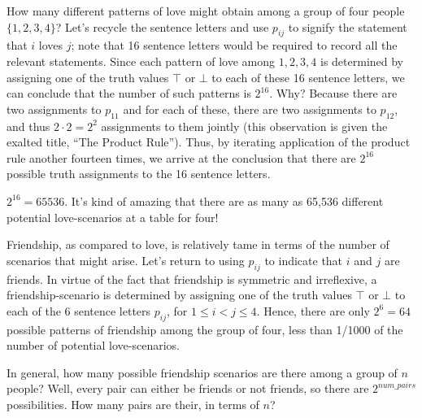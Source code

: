 How many different patterns of love might obtain among a group of four people $\{1,2,3,4\}$? Let's recycle the sentence letters and use $p_{ij}$ to signify the statement that $i$ loves $j$; note that 16 sentence letters would be required to record all the relevant statements. Since each pattern of love among $1,2,3,4$ is determined by assigning one of the truth values $\top$ or $\bot$ to each of these 16 sentence letters, we can conclude that the number of such patterns is $2^{16}$. Why? Because there are two assignments to $p_{11}$ and for each of these, there are two assignments to $p_{12}$, and thus $2\cdot 2 = 2^2$ assignments to them jointly (this observation is given the exalted title, ``The Product Rule''). Thus, by iterating application of the product rule another fourteen times, we arrive at the conclusion that there are $2^{16}$ possible truth assignments to the 16 sentence letters. 

\begin{aside}
    $2^{16} = 65536$. It's kind of amazing that there are as many as 65,536 different potential love-scenarios at a table for four!
\end{aside}

Friendship, as compared to love, is relatively tame in terms of the number of scenarios that might arise. Let's return to using $p_{ij}$ to indicate that $i$ and $j$ are friends. In virtue of the fact that friendship is symmetric and irreflexive, a friendship-scenario is determined by assigning one of the truth values $\top$ or $\bot$ to each of the 6 sentence letters $p_{ij}$, for $1\leq i < j\leq 4$. Hence, there are only $2^6=64$ possible patterns of friendship among the group of four, less than 1/1000 of the number of potential love-scenarios. 

\begin{aside}
In general, how many possible friendship scenarios are there among a group of $n$ people? Well, every pair can either be friends or not friends, so there are $2^{num\_pairs}$ possibilities. How many pairs are their, in terms of $n$? 
\end{aside}

\newpage

